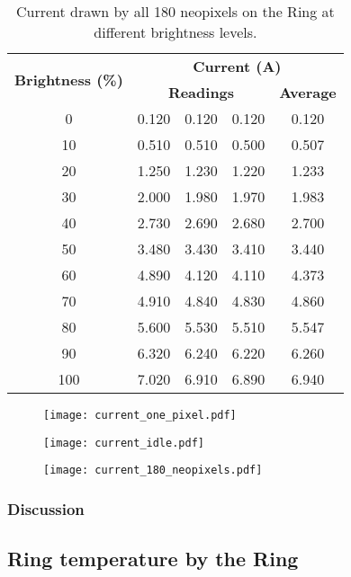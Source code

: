 \begin{table}[h!]
	\centering
	\caption{Current drawn by all 180 neopixels on the Ring at different brightness levels.}
	\label{table:current_180_neopixels}
	\begin{tabular}{ccccc}
		\hline
		\hline
		\toprule
		\multirow{2}{*}{\textbf{Brightness (\%)}} & \multicolumn{4}{c}{\textbf{Current (A)}}\\
		& \multicolumn{3}{c}{\textbf{Readings}} & \textbf{Average} \\
		\bottomrule
		\toprule
		0	&	0.120	&	0.120	&	0.120	&	0.120	\\
		10	&	0.510	&	0.510	&	0.500	&	0.507	\\
		20	&	1.250	&	1.230	&	1.220	&	1.233	\\
		30	&	2.000	&	1.980	&	1.970	&	1.983	\\
		40	&	2.730	&	2.690	&	2.680	&	2.700	\\
		50	&	3.480	&	3.430	&	3.410	&	3.440	\\
		60	&	4.890	&	4.120	&	4.110	&	4.373	\\
		70	&	4.910	&	4.840	&	4.830	&	4.860	\\
		80	&	5.600	&	5.530	&	5.510	&	5.547	\\
		90	&	6.320	&	6.240	&	6.220	&	6.260	\\
		100	&	7.020	&	6.910	&	6.890	&	6.940	\\
		\bottomrule
		\hline
		\hline
	\end{tabular}
\end{table}

\begin{figure}[ht]
	\centering
	\texttt{[image: current\_one\_pixel.pdf]}
	\caption{}
	\label{fig:current_one_pixel}
\end{figure}
\begin{figure}[ht]
	\centering
	\texttt{[image: current\_idle.pdf]}
	\caption{}
	\label{fig:current_idle}
\end{figure}
\begin{figure}[ht]
	\centering
	\texttt{[image: current\_180\_neopixels.pdf]}
	\caption{}
	\label{fig:current_180_neopixels}
\end{figure}

\subsubsection{Discussion}

\subsection{Ring temperature by the Ring}
